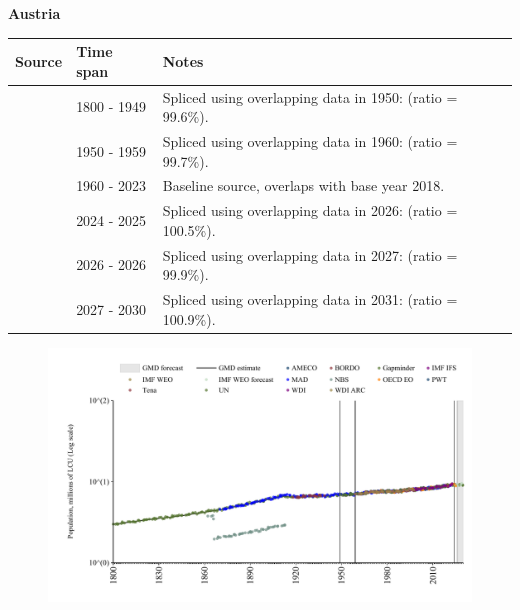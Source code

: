 \documentclass[12pt,a4paper,landscape]{article}
\begin{document}
\begin{adjustbox}{max totalsize={\paperwidth}{\paperheight},center}
\begin{minipage}[t][\textheight][t]{\textwidth}
\vspace*{0.5cm}
{}
\begin{center}
{\Large\bfseries Austria}
\end{center}
\vspace{0.5cm}
\begin{table}[H]
\centering
\small
\begin{tabular}{|l|l|l|}
\hline
\textbf{Source} & \textbf{Time span} & \textbf{Notes} \\
\hline
\rowcolor{white}\cite{Gapminder}& 1800 - 1949 &Spliced using overlapping data in 1950: (ratio = 99.6\%).\\
\rowcolor{lightgray}\cite{IMF_IFS}& 1950 - 1959 &Spliced using overlapping data in 1960: (ratio = 99.7\%).\\
\rowcolor{white}\cite{WDI}& 1960 - 2023 &Baseline source, overlaps with base year 2018.\\
\rowcolor{lightgray}\cite{OECD_EO}& 2024 - 2025 &Spliced using overlapping data in 2026: (ratio = 100.5\%).\\
\rowcolor{white}\cite{AMECO}& 2026 - 2026 &Spliced using overlapping data in 2027: (ratio = 99.9\%).\\
\rowcolor{lightgray}\cite{Gapminder}& 2027 - 2030 &Spliced using overlapping data in 2031: (ratio = 100.9\%).\\
\hline
\end{tabular}
\end{table}
\begin{figure}[H]
\centering
\includegraphics[width=\textwidth,height=0.6\textheight,keepaspectratio]{graphs/AUT_pop.pdf}
\end{figure}
\end{minipage}
\end{adjustbox}
\end{document}
